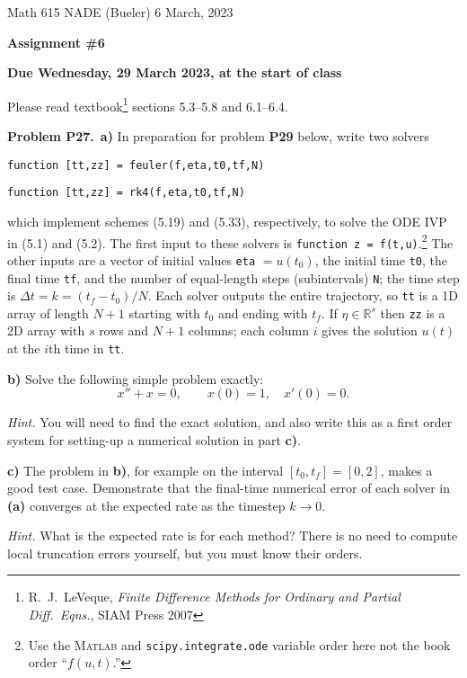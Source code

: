 \documentclass[12pt]{amsart}
\newcommand{\RR}{\mathbb{R}}
\newcommand{\Matlab}{\textsc{Matlab}\xspace}
\newcommand{\prob}[1]{\bigskip\noindent\textbf{#1}\quad }
\newcommand{\epart}[1]{\medskip\noindent\textbf{#1)}\quad }
\newcommand{\ppart}[1]{\,\textbf{#1)}\quad }
\begin{document}
\scriptsize \noindent Math 615 NADE (Bueler) \hfill 6 March, 2023
\normalsize

\medskip\bigskip

\Large\centerline{\textbf{Assignment \#6}}
\large
\bigskip

\centerline{\textbf{Due Wednesday, 29 March 2023, at the start of class}}
\bigskip
\normalsize

\thispagestyle{empty}

\bigskip
Please read textbook\footnote{R.~J.~LeVeque, \emph{Finite Difference Methods for Ordinary and Partial Diff.~Eqns.}, SIAM Press 2007} sections 5.3--5.8 and 6.1--6.4.


\medskip
\prob{Problem P27.}  \ppart{a}  In preparation for problem \textbf{P29} below, write two solvers

\centerline{\texttt{function [tt,zz] = feuler(f,eta,t0,tf,N)}}

\centerline{\texttt{function [tt,zz] = rk4(f,eta,t0,tf,N)}}

\noindent which implement schemes (5.19) and (5.33), respectively, to solve the ODE IVP in (5.1) and (5.2).  The first input to these solvers is \texttt{function z = f(t,u)}.\footnote{Use the \Matlab and \texttt{scipy.integrate.ode} variable order here not the book order ``$f(u,t)$.''}  The other inputs are a vector of initial values \texttt{eta} $= u(t_0)$, the initial time \texttt{t0}, the final time \texttt{tf}, and the number of equal-length steps (subintervals) \texttt{N}; the time step is $\Delta t = k = (t_f-t_0)/N$.  Each solver outputs the entire trajectory, so \texttt{tt} is a 1D array of length $N+1$ starting with $t_0$ and ending with $t_f$.  If $\eta\in\RR^s$ then \texttt{zz} is a 2D array with $s$ rows and $N+1$ columns; each column $i$ gives the solution $u(t)$ at the $i$th time in \texttt{tt}.

\epart{b}  Solve the following simple problem exactly:
    $$x'' + x = 0, \qquad x(0)=1, \quad x'(0)=0.$$

\medskip
\noindent \emph{Hint.}  You will need to find the exact solution, and also write this as a first order system for setting-up a numerical solution in part \textbf{c)}.

\epart{c} The problem in \textbf{b)}, for example on the interval $[t_0,t_f] = [0,2]$, makes a good test case.  Demonstrate that the final-time numerical error of each solver in \textbf{(a)} converges at the expected rate as the timestep $k\to 0$.

\medskip
\noindent \emph{Hint.} What is the expected rate is for each method?  There is no need to compute local truncation errors yourself, but you must know their orders.
\end{document}
